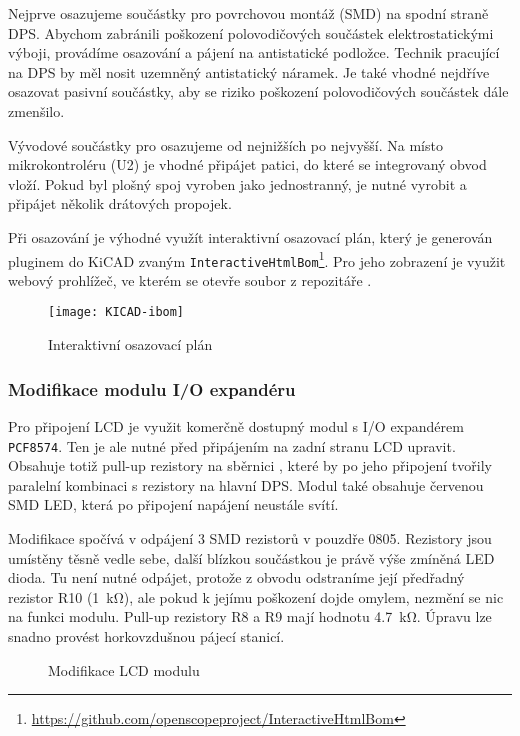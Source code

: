 Nejprve osazujeme součástky pro povrchovou montáž (\acs{SMD}) na spodní straně
DPS. Abychom zabránili poškození polovodičových součástek elektrostatickými
výboji, provádíme osazování a pájení na antistatické podložce. Technik
pracující na DPS by měl nosit uzemněný antistatický náramek. Je také vhodné
nejdříve osazovat pasivní součástky, aby se riziko poškození polovodičových
součástek dále zmenšilo.

Vývodové součástky pro osazujeme od nejnižších po nejvyšší. Na místo
mikrokontroléru (U2) je vhodné připájet patici, do které se integrovaný obvod
vloží. Pokud byl plošný spoj vyroben jako jednostranný, je nutné vyrobit
a připájet několik drátových propojek.

Při osazování je výhodné využít interaktivní osazovací plán, který je generován
pluginem do KiCAD zvaným
\texttt{InteractiveHtmlBom}\footnote{\url{https://github.com/openscopeproject/InteractiveHtmlBom}}.
Pro jeho zobrazení je využit webový prohlížeč, ve kterém se otevře soubor
 z repozitáře .

\begin{figure}[htbp]
    \centering
    \texttt{[image: KICAD-ibom]}
    \caption{Interaktivní osazovací plán}
    \label{fig:PCB ibom}
\end{figure}


\subsubsection{Modifikace modulu I/O expandéru}
Pro připojení LCD je využit komerčně dostupný modul s I/O expandérem
\texttt{PCF8574}. Ten je ale nutné před připájením na zadní stranu LCD upravit.
Obsahuje totiž pull-up rezistory na sběrnici \IIC{}, které by po jeho připojení
tvořily paralelní kombinaci s rezistory na hlavní DPS. Modul také obsahuje
červenou SMD LED, která po připojení napájení neustále svítí.

Modifikace spočívá v odpájení 3 SMD rezistorů v pouzdře 0805. Rezistory jsou
umístěny těsně vedle sebe, další blízkou součástkou je právě výše zmíněná LED
dioda. Tu není nutné odpájet, protože z obvodu odstraníme její předřadný
rezistor R10 (\SI{1}{\kilo\ohm}), ale pokud k jejímu poškození dojde omylem,
nezmění se nic na funkci modulu. Pull-up rezistory R8 a R9 mají hodnotu
\SI{4,7}{\kilo\ohm}. Úpravu lze snadno provést horkovzdušnou pájecí stanicí.

\begin{figure}[htbp]
    \centering
    \caption{Modifikace LCD modulu}
    \label{fig:PCB LCD modul modifikace}
\end{figure}


